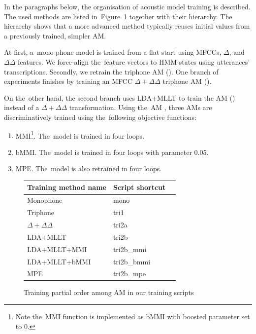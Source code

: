 In the paragraphs below, the organisation of acoustic model training is described. 
The used methods are listed in~Figure~\ref{fig:am-deps} together with their hierarchy.
The hierarchy shows that a more advanced method typically reuses initial values from a previously trained, simpler \ac{AM}.

At first, a~mono-phone model is trained from a flat start using MFCCs, $\Delta$, and $\Delta \Delta$ features.
We force-align the~feature vectors to HMM states using utterances' transcriptions.
Secondly, we retrain the triphone \ac{AM} ().
One branch of experiments finishes by training an \ac{MFCC} $\Delta + \Delta\Delta$ triphone \ac{AM} (). %

On the~other hand, the second branch uses \ac{LDA}+\ac{MLLT} to train the \ac{AM} () instead of a $\Delta + \Delta\Delta$ transformation.
Using the~\ac{AM} , three \acp{AM} are discriminatively trained using the~following objective functions:
\begin{enumerate}
    \item \acl{MMI}\cite{chow1990maximum}\footnote{Note the~\ac{MMI} function is implemented as \acs{bMMI} with boosted parameter set to 0.}. The~model  is trained in four loops.
    \item \acl{bMMI}\cite{povey2008boosted}. The~model  is trained in four loops with parameter 0.05.
    \item \acl{MPE}\cite{povey2003mmi}. The~model  is also retrained in four loops.
\end{enumerate}

\begin{figure}[!htp]
    \begin{center}
    
    {\small \begin{tabular}{lll}
    \hline
    Training method name & Script shortcut \\
    \hline
    Monophone & mono \\
    Triphone  & tri1 \\
    $\Delta + \Delta\Delta$ & tri2a  \\
    \acs{LDA}+\acs{MLLT} & tri2b  \\
    \acs{LDA}+\acs{MLLT}+\acs{MMI} & tri2b\_mmi \\
    \acs{LDA}+\acs{MLLT}+\acs{bMMI} & tri2b\_bmmi \\
    \acs{MPE} & tri2b\_mpe \\
    \hline
    \end{tabular}}
    \end{center}
    \caption{Training partial order among \ac{AM} in our training scripts}
    \label{fig:am-deps} 
\end{figure}

